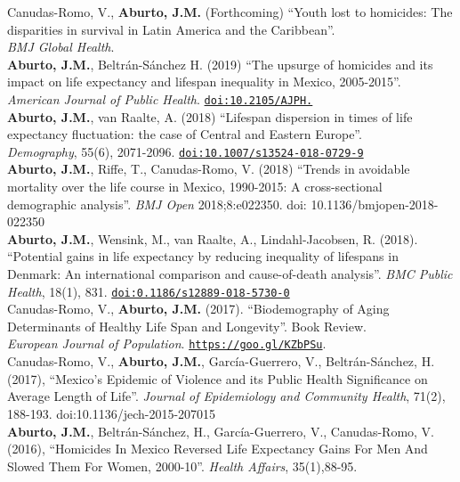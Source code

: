 \documentclass[12pt]{article}
\providecommand*\url[1]{\href{#1}{#1}}
\renewcommand*\url[1]{\href{#1}{\texttt{#1}}}
\begin{document}
Canudas-Romo, V., \textbf{Aburto, J.M.} (Forthcoming) ``Youth lost to homicides: The disparities in survival in Latin America and the Caribbean''. \\ \textit{BMJ Global Health}.\\

\textbf{Aburto, J.M.}, Beltr\'an-S\'anchez H. (2019) ``The upsurge of homicides and its impact on life expectancy and lifespan inequality in Mexico, 2005-2015''. \textit{ American Journal of Public Health}. \url{doi:10.2105/AJPH.}\\
 
\textbf{Aburto, J.M.}, van Raalte, A. (2018) ``Lifespan dispersion in times of life expectancy fluctuation: the case of Central and Eastern Europe''.\\ \textit{Demography}, 55(6), 2071-2096. \url{doi:10.1007/s13524-018-0729-9} \\

 \textbf{Aburto, J.M.}, Riffe, T., Canudas-Romo, V. (2018) ``Trends in avoidable mortality over the life course in Mexico, 1990-2015:  A cross-sectional demographic analysis''. \emph{BMJ Open} 2018;8:e022350. doi: 10.1136/bmjopen-2018-022350 \\


  \textbf{Aburto, J.M.}, Wensink, M., van Raalte, A., Lindahl-Jacobsen, R. (2018). ``Potential gains in life expectancy by reducing inequality of lifespans in Denmark: An international comparison and cause-of-death analysis''. \emph{BMC Public Health}, 18(1), 831. \url{doi:0.1186/s12889-018-5730-0} \\
  
Canudas-Romo, V.,  \textbf{Aburto, J.M.} (2017). ``Biodemography of Aging Determinants of Healthy Life Span and Longevity''. Book Review.\\ \emph{European Journal of Population}. \url{https://goo.gl/KZbPSu}. \\ 

Canudas-Romo, V.,  \textbf{Aburto, J.M.}, Garc\'ia-Guerrero, V., Beltr\'an-S\'anchez, H. (2017),  ``Mexico's Epidemic of Violence and its Public Health Significance on Average Length of Life''. \emph{Journal of Epidemiology and Community Health}, 71(2), 188-193. doi:10.1136/jech-2015-207015 \\ 
	 
\textbf{Aburto, J.M.}, Beltr\'an-S\'anchez, H., Garc\'ia-Guerrero, V., Canudas-Romo, V. (2016), ``Homicides In Mexico Reversed Life Expectancy Gains For Men And Slowed Them For Women, 2000-10''. \emph{Health Affairs}, 35(1),88-95. \\ 
		     
\end{document}
